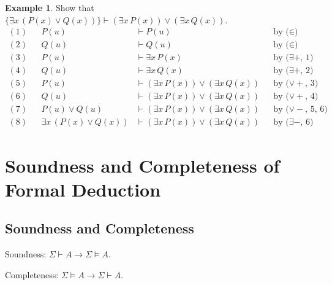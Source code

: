 \documentclass[11pt]{article}
\theoremstyle{definition}
\newtheorem{exmp}[thm]{Example}
\begin{document}
\begin{exmp}
Show that $\{\exists x \, (P(x) \vee Q(x))\} \vdash (\exists x \, P(x)) \vee (\exists x \, Q(x))$.
\begin{align*}
    (1) & & P(u) &\vdash P(u) & & \text{by ($\in$)} \\
    (2) & & Q(u) &\vdash Q(u) & & \text{by ($\in$)} \\
    (3) & & P(u) &\vdash \exists x \, P(x) & & \text{by ($\exists+$, 1)} \\
    (4) & & Q(u) &\vdash \exists x \, Q(x) & & \text{by ($\exists+$, 2)} \\
    (5) & & P(u) &\vdash (\exists x \, P(x)) \vee (\exists x \, Q(x)) & & \text{by ($\vee+$, 3)} \\
    (6) & & Q(u) &\vdash (\exists x \, P(x)) \vee (\exists x \, Q(x)) & & \text{by ($\vee+$, 4)} \\
    (7) & & P(u) \vee Q(u) &\vdash (\exists x \, P(x)) \vee (\exists x \, Q(x)) & & \text{by ($\vee-$, 5, 6)} \\
    (8) & & \exists x \, (P(x) \vee Q(x)) &\vdash (\exists x \, P(x)) \vee (\exists x \, Q(x)) & & \text{by ($\exists-$, 6)}
\end{align*}
\end{exmp}

\newpage
\section{Soundness and Completeness of Formal Deduction}

\subsection{Soundness and Completeness}
Soundness: $\Sigma \vdash A \rightarrow \Sigma \vDash A$.

Completeness: $\Sigma \vDash A \rightarrow \Sigma \vdash A$.
\end{document}
